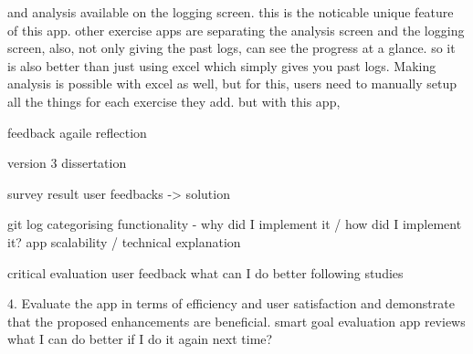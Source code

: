 and analysis available on the logging screen. 
this is the noticable unique feature of this app. 
other exercise apps are separating the analysis screen and the logging screen, 
also, not only giving the past logs, can see the progress at a glance. 
so it is also better than just using excel which simply gives you past logs.
Making analysis is possible with excel as well, but for this, users need to manually setup all the things for each exercise they add.
but with this app, 



feedback agaile reflection


version 3 dissertation

survey result
user feedbacks -> solution


git log categorising
functionality - why did I implement it / how did I implement it?
app scalability / technical explanation



critical evaluation
user feedback
what can I do better
following studies

4. Evaluate the app in terms of efficiency and user satisfaction and demonstrate that the proposed enhancements are beneficial.
	smart goal evaluation
	app reviews
	what I can do better if I do it again next time?